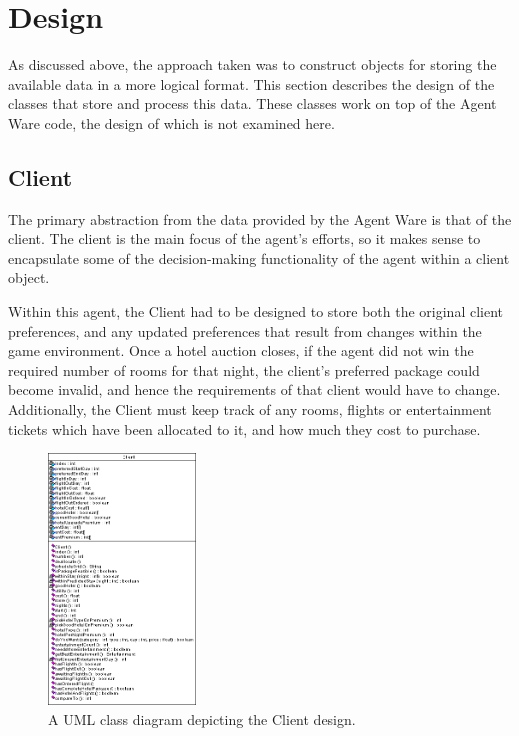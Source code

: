 \documentclass{acm_proc_article-sp}
\begin{document}
\section{Design}
 \label{design}

 As discussed above, the approach taken was to construct objects for storing the available data in a more logical format.  This section describes the design of the classes that store and process this data.  These classes work on top of the Agent Ware code, the design of which is not examined here.
 
 \subsection{Client}
  The primary abstraction from the data provided by the Agent Ware is that of the client.  The client is the main focus of the agent's efforts, so it makes sense to encapsulate some of the decision-making functionality of the agent within a client object.
  
  Within this agent, the Client had to be designed to store both the original client preferences, and any updated preferences that result from changes within the game environment.  Once a hotel auction closes, if the agent did not win the required number of rooms for that night, the client's preferred package could become invalid, and hence the requirements of that client would have to change.  Additionally, the Client must keep track of any rooms, flights or entertainment tickets which have been allocated to it, and how much they cost to purchase.
  
\begin{figure}
  \begin{center}
    \includegraphics[keepaspectratio=true, width=0.35\textwidth]{client2}
  \end{center}
  \caption{A UML class diagram depicting the Client design.}
  \label{client}
\end{figure}
  
\end{document}
